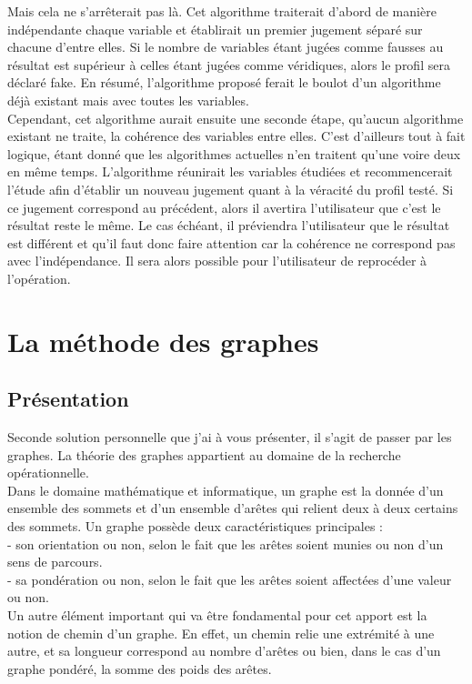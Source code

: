 \documentclass[12pt]{report}
\begin{document}
Mais cela ne s'arrêterait pas là. Cet algorithme traiterait d'abord de manière indépendante chaque variable et établirait un premier jugement séparé sur chacune d'entre elles. Si le nombre de variables étant jugées comme fausses au résultat est supérieur à celles étant jugées comme véridiques, alors le profil sera déclaré fake. En résumé, l'algorithme proposé ferait le boulot d'un algorithme déjà existant mais avec toutes les variables. \\

Cependant, cet algorithme aurait ensuite une seconde étape, qu'aucun algorithme existant ne traite, la cohérence des variables entre elles. C'est d'ailleurs tout à fait logique, étant donné que les algorithmes actuelles n'en traitent qu'une voire deux en même temps. L'algorithme réunirait les variables étudiées et recommencerait l'étude afin d'établir un nouveau jugement quant à la véracité du profil testé. Si ce jugement correspond au précédent, alors il avertira l'utilisateur que c'est le résultat reste le même. Le cas échéant, il préviendra l'utilisateur que le résultat est différent et qu'il faut donc faire attention car la cohérence ne correspond pas avec l'indépendance. Il sera alors possible pour l'utilisateur de reprocéder à l'opération. 

\section{La méthode des graphes}
\subsection{Présentation}
Seconde solution personnelle que j'ai à vous présenter, il s'agit de passer par les graphes. La théorie des graphes appartient au domaine de la recherche opérationnelle. \\

Dans le domaine mathématique et informatique, un graphe est la donnée d'un ensemble des sommets et d'un ensemble d'arêtes qui relient deux à deux certains des sommets. Un graphe possède deux caractéristiques principales : \\
- son orientation ou non, selon le fait que les arêtes soient munies ou non d'un sens de parcours.\\
- sa pondération ou non, selon le fait que les arêtes soient affectées d'une valeur ou non.\\

Un autre élément important qui va être fondamental pour cet apport est la notion de chemin d'un graphe. En effet, un chemin relie une extrémité à une autre, et sa longueur correspond au nombre d'arêtes ou bien, dans le cas d'un graphe pondéré, la somme des poids des arêtes.\\
\end{document}
